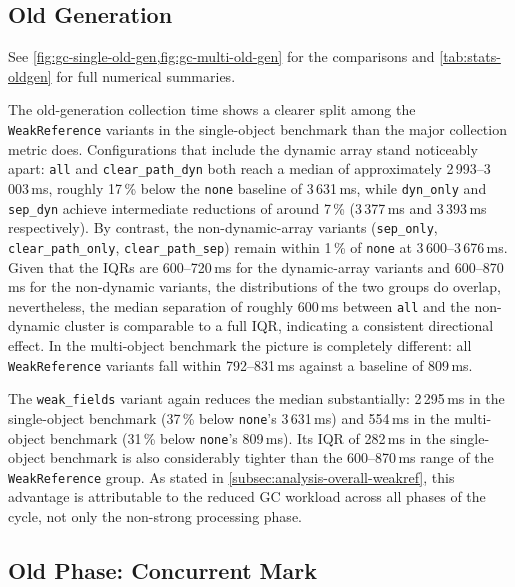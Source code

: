 \subsection{Old Generation}
\label{subsec:analysis-overall-oldgen}

See \cref{fig:gc-single-old-gen,fig:gc-multi-old-gen} for the comparisons and \cref{tab:stats-oldgen} for full numerical summaries.

The old-generation collection time shows a clearer split among the \texttt{WeakReference} variants in the single-object benchmark than the major collection metric does. Configurations that include the dynamic array stand noticeably apart: \texttt{all} and \texttt{clear\_path\_dyn} both reach a median of approximately 2\,993--3\,003\,ms, roughly 17\,\% below the \texttt{none} baseline of 3\,631\,ms, while \texttt{dyn\_only} and \texttt{sep\_dyn} achieve intermediate reductions of around 7\,\% (3\,377\,ms and 3\,393\,ms respectively). By contrast, the non-dynamic-array variants (\texttt{sep\_only}, \texttt{clear\_path\_only}, \texttt{clear\_path\_sep}) remain within 1\,\% of \texttt{none} at 3\,600--3\,676\,ms. Given that the \acp{IQR} are 600--720\,ms for the dynamic-array variants and 600--870\,ms for the non-dynamic variants, the distributions of the two groups do overlap, nevertheless, the median separation of roughly 600\,ms between \texttt{all} and the non-dynamic cluster is comparable to a full IQR, indicating a consistent directional effect. In the multi-object benchmark the picture is completely different: all \texttt{WeakReference} variants fall within 792--831\,ms against a baseline of 809\,ms.

The \texttt{weak\_fields} variant again reduces the median substantially: 2\,295\,ms in the single-object benchmark (37\,\% below \texttt{none}'s 3\,631\,ms) and 554\,ms in the multi-object benchmark (31\,\% below \texttt{none}'s 809\,ms). Its IQR of 282\,ms in the single-object benchmark is also considerably tighter than the 600--870\,ms range of the \texttt{WeakReference} group. As stated in \cref{subsec:analysis-overall-weakref}, this advantage is attributable to the reduced \ac{GC} workload across all phases of the cycle, not only the non-strong processing phase.



\subsection{Old Phase: Concurrent Mark}
\label{subsec:analysis-overall-mark}

